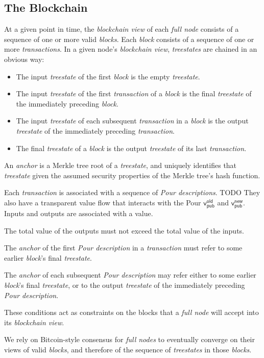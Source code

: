 \documentclass{article}
\newcommand{\term}[1]{\textsl{#1}\xspace}
\newcommand{\PourDescription}{\term{Pour description}}
\newcommand{\PourDescriptions}{\term{Pour descriptions}}
\newcommand{\fullnode}{\term{full node}}
\newcommand{\fullnodes}{\term{full nodes}}
\newcommand{\anchor}{\term{anchor}}
\newcommand{\block}{\term{block}}
\newcommand{\blocks}{\term{blocks}}
\newcommand{\transaction}{\term{transaction}}
\newcommand{\transactions}{\term{transactions}}
\newcommand{\blockchainview}{\term{blockchain view}}
\newcommand{\treestate}{\term{treestate}}
\newcommand{\treestates}{\term{treestates}}
\newcommand{\vpubOld}{\mathsf{v_{pub}^{old}}}
\newcommand{\vpubNew}{\mathsf{v_{pub}^{new}}}
\begin{document}
\subsection{The Blockchain}

At a given point in time, the \blockchainview of each \fullnode consists of a
sequence of one or more valid \blocks. Each \block consists of a sequence of one or
more \transactions. In a given node's \blockchainview, \treestates are chained in an
obvious way:

\begin{itemize}
  \item The input \treestate of the first \block is the empty \treestate.
  \item The input \treestate of the first \transaction of a \block is the final
        \treestate of the immediately preceding \block.
  \item The input \treestate of each subsequent \transaction in a \block is the
        output \treestate of the immediately preceding \transaction.
  \item The final \treestate of a \block is the output \treestate of its last
        \transaction.
\end{itemize}

An \anchor is a Merkle tree root of a \treestate, and uniquely identifies that
\treestate given the assumed security properties of the Merkle tree's hash function.

Each \transaction is associated with a sequence of \PourDescriptions. TODO They also have
a transparent value flow that interacts with the Pour $\vpubOld$ and $\vpubNew$.
Inputs and outputs are associated with a value.

The total value of the outputs must not exceed the total value of the inputs.

The \anchor of the first \PourDescription in a \transaction must refer to some
earlier \block's final \treestate.

The \anchor of each subsequent \PourDescription may refer either to some earlier
\block's final \treestate, or to the output \treestate of the immediately preceding
\PourDescription.

These conditions act as constraints on the blocks that a \fullnode will
accept into its \blockchainview.

We rely on Bitcoin-style consensus for \fullnodes to eventually converge on their 
views of valid \blocks, and therefore of the sequence of \treestates in those 
\blocks.
\end{document}
